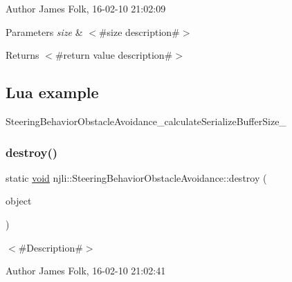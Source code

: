 \begin{DoxyAuthor}{Author}
James Folk, 16-\/02-\/10 21\+:02\+:09
\end{DoxyAuthor}

\begin{DoxyParams}{Parameters}
{\em size} & $<$\#size description\#$>$\\
\hline
\end{DoxyParams}
\begin{DoxyReturn}{Returns}
$<$\#return value description\#$>$
\end{DoxyReturn}
\hypertarget{classnjli_1_1_steering_behavior_wander_ex1}{}\subsection{Lua example}\label{classnjli_1_1_steering_behavior_wander_ex1}

\begin{DoxyCodeInclude}
\end{DoxyCodeInclude}
Steering\+Behavior\+Obstacle\+Avoidance\+\_\+calculate\+Serialize\+Buffer\+Size\+\_\+ \mbox{\label{classnjli_1_1_steering_behavior_obstacle_avoidance_ac71d0e1386a71fec11787e0efc174f60}} 
\subsubsection{\texorpdfstring{destroy()}{destroy()}}
{\footnotesize\ttfamily static \mbox{\hyperlink{_thread_8h_af1e856da2e658414cb2456cb6f7ebc66}{void}} njli\+::\+Steering\+Behavior\+Obstacle\+Avoidance\+::destroy (\begin{DoxyParamCaption}\item[{\mbox{\hyperlink{classnjli_1_1_steering_behavior_obstacle_avoidance}{Steering\+Behavior\+Obstacle\+Avoidance}} $\ast$}]{object }\end{DoxyParamCaption})\hspace{0.3cm}{\ttfamily [static]}}



$<$\#\+Description\#$>$ 

\begin{DoxyAuthor}{Author}
James Folk, 16-\/02-\/10 21\+:02\+:41
\end{DoxyAuthor}

